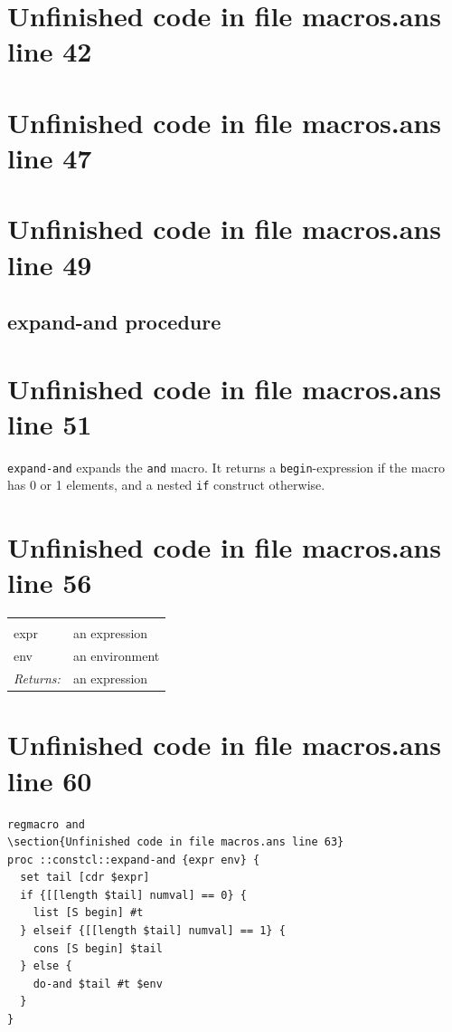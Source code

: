 \documentclass[twoside,9pt]{report}
\begin{document}
\section{Unfinished code in file macros.ans line 42}
\section{Unfinished code in file macros.ans line 47}
\section{Unfinished code in file macros.ans line 49}
\subsection{expand-and procedure}
\label{expand-and-procedure}
\section{Unfinished code in file macros.ans line 51}


\texttt{expand-and} expands the \texttt{and} macro. It returns a \texttt{begin}-expression if the macro has 0 or 1 elements, and a nested \texttt{if} construct otherwise.

\section{Unfinished code in file macros.ans line 56}
\noindent\begin{tabular}{ |p{1.9cm} p{8cm}| }
\hline
\rowcolor[HTML]{CCCCCC} \multicolumn{2}{|l|}{\bf expand-and (internal)} \\
expr & an expression \\
env & an environment \\
\textit{Returns:} & an expression \\
\hline
\end{tabular}
\section{Unfinished code in file macros.ans line 60}
\begin{lstlisting}
regmacro and
\section{Unfinished code in file macros.ans line 63}
proc ::constcl::expand-and {expr env} {
  set tail [cdr $expr]
  if {[[length $tail] numval] == 0} {
    list [S begin] #t
  } elseif {[[length $tail] numval] == 1} {
    cons [S begin] $tail
  } else {
    do-and $tail #t $env
  }
}
\end{lstlisting}
\end{document}

